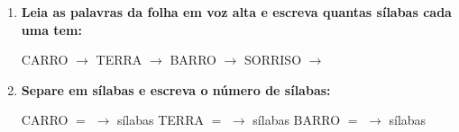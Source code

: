 \begin{exercicio}
\begin{enumerate}[resume]
  \item \textbf{Leia as palavras da folha em voz alta e escreva quantas sílabas cada uma tem:}

  \begin{center}
  CARRO $\rightarrow$ \underline{\hspace{1cm}} \quad TERRA $\rightarrow$ \underline{\hspace{1cm}} \quad BARRO $\rightarrow$ \underline{\hspace{1cm}} \quad SORRISO $\rightarrow$ \underline{\hspace{1cm}}
  \end{center}

  \item \textbf{Separe em sílabas e escreva o número de sílabas:}
  \begin{center}
  CARRO $=$ \underline{\hspace{1.2cm}} $\rightarrow$ \underline{\hspace{0.8cm}} sílabas \quad TERRA $=$ \underline{\hspace{1.2cm}} $\rightarrow$ \underline{\hspace{0.8cm}} sílabas \quad BARRO $=$ \underline{\hspace{1.2cm}} $\rightarrow$ \underline{\hspace{0.8cm}} sílabas
  \end{center}

\end{enumerate}

\end{exercicio}



